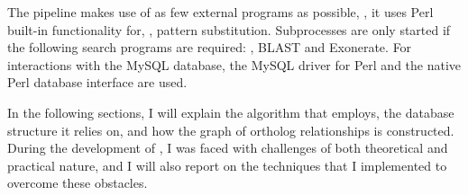 The pipeline makes use of as few external programs as possible, \ie, it
uses Perl built-in functionality for, \eg, pattern substitution. Subprocesses
are only started if the following search programs are required: ,
BLAST and Exonerate. For interactions with the MySQL database, the MySQL driver
 for Perl and the native Perl database
interface  are used.

In the following sections, I will explain the algorithm that \pname employs, the
database structure it relies on, and how the graph of ortholog relationships is
constructed. During the development of \pname, I was faced with challenges of
both theoretical and practical nature, and I will also report on the techniques
that I implemented to overcome these obstacles.

